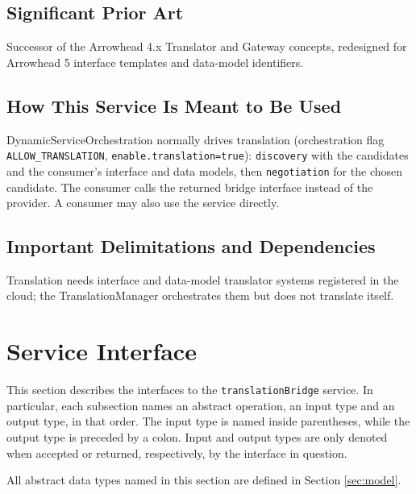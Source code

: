 \documentclass[a4paper]{arrowhead}
\begin{document}
\subsection{Significant Prior Art}

Successor of the Arrowhead 4.x Translator and Gateway concepts, redesigned for Arrowhead 5 interface templates and data-model identifiers.

\subsection{How This Service Is Meant to Be Used}

Dynamic\allowbreak{}Service\allowbreak{}Orchestration normally drives translation (orchestration flag \texttt{ALLOW\_\allowbreak{}TRANSLATION}, \texttt{enable.\allowbreak{}translation=\allowbreak{}true}): \texttt{discovery} with the candidates and the consumer's interface and data models, then \texttt{negotiation} for the chosen candidate. The consumer calls the returned bridge interface instead of the provider. A consumer may also use the service directly.

\subsection{Important Delimitations and Dependencies}
\label{sec:delimitations}

Translation needs interface and data-model translator systems registered in the cloud; the Translation\allowbreak{}Manager orchestrates them but does not translate itself.

\newpage

\section{Service Interface}
\label{sec:operations}

This section describes the interfaces to the \texttt{translationBridge} service.
In particular, each subsection names an abstract operation, an input type and an output type, in that order.
The input type is named inside parentheses, while the output type is preceded by a colon.
Input and output types are only denoted when accepted or returned, respectively, by the interface in question.

All abstract data types named in this section are defined in Section \ref{sec:model}.
\end{document}
